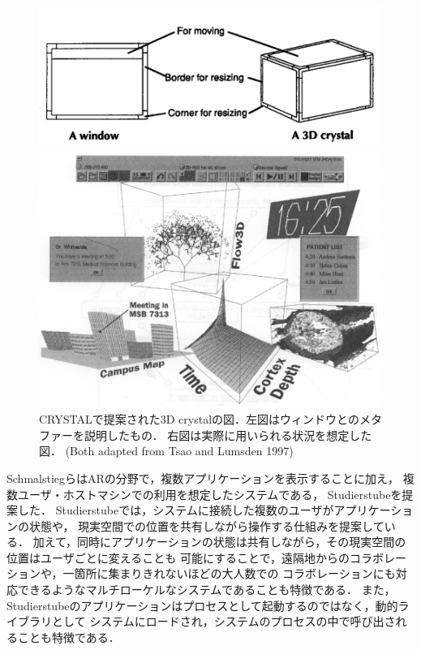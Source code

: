\begin{figure}[htbp]
  \begin{minipage}[t]{0.49\linewidth}
    \captionsetup[sub]{margin=0.1cm}
    \centering
    \includegraphics[keepaspectratio, width=\linewidth]{figures/crystal-window.png}
    \subcaption*{}
  \end{minipage}
  \begin{minipage}[t]{0.5\linewidth}
    \captionsetup[sub]{margin=0.1cm}
    \centering
    \includegraphics[keepaspectratio, width=\linewidth]{figures/crystal-ve.png}
    \subcaption*{}
  \end{minipage}
  \centering
  \caption{
    CRYSTALで提案された3D crystalの図．左図はウィンドウとのメタファーを説明したもの．
    右図は実際に用いられる状況を想定した図．
    (Both adapted from Tsao and Lumsden 1997\cite{crystal})
  }
  \label{fig:crystal-window}
\end{figure}

SchmalstiegらはARの分野で，複数アプリケーションを表示することに加え，
複数ユーザ・ホストマシンでの利用を想定したシステムである，
Studierstube\cite{studierstube}を提案した．
Studierstubeでは，システムに接続した複数のユーザがアプリケーションの状態や，
現実空間での位置を共有しながら操作する仕組みを提案している．
加えて，同時にアプリケーションの状態は共有しながら，その現実空間の位置はユーザごとに変えることも
可能にすることで，遠隔地からのコラボレーションや，一箇所に集まりきれないほどの大人数での
コラボレーションにも対応できるようなマルチローケルなシステムであることも特徴である．
また，Studierstubeのアプリケーションはプロセスとして起動するのではなく，動的ライブラリとして
システムにロードされ，システムのプロセスの中で呼び出されることも特徴である．

